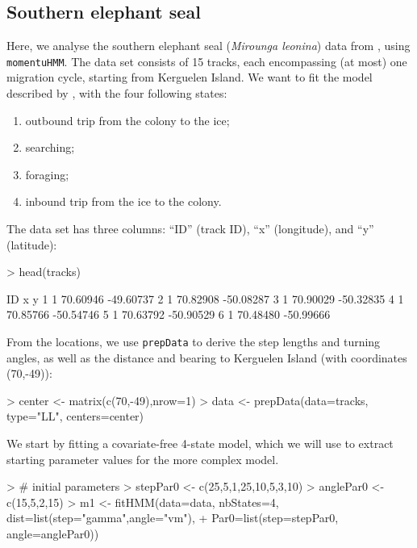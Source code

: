 \documentclass[12pt]{article}
\begin{document}
\subsection{Southern elephant seal}
Here, we analyse the southern elephant seal (\emph{Mirounga leonina}) data from \cite{MichelotEtAl2017}, using \verb|momentuHMM|. The data set consists of 15 tracks, each encompassing (at most) one migration cycle, starting from Kerguelen Island. We want to fit the model described by \cite{MichelotEtAl2017}, with the four following states:
\begin{enumerate}
\item outbound trip from the colony to the ice;
\item searching;
\item foraging;
\item inbound trip from the ice to the colony.
\end{enumerate}



The data set has three columns: ``ID'' (track ID), ``x'' (longitude), and ``y'' (latitude):

\begin{Schunk}
\begin{Sinput}
> head(tracks)
\end{Sinput}
\begin{Soutput}
  ID        x         y
1  1 70.60946 -49.60737
2  1 70.82908 -50.08287
3  1 70.90029 -50.32835
4  1 70.85766 -50.54746
5  1 70.63792 -50.90529
6  1 70.48480 -50.99666
\end{Soutput}
\end{Schunk}

From the locations, we use \verb|prepData| to derive the step lengths and turning angles, as well as the distance and bearing to Kerguelen Island (with coordinates (70,-49)):
\begin{Schunk}
\begin{Sinput}
> center <- matrix(c(70,-49),nrow=1)
> data <- prepData(data=tracks, type="LL", centers=center)
\end{Sinput}
\end{Schunk}

We start by fitting a covariate-free 4-state model, which we will use to extract starting parameter values for the more complex model.
\begin{Schunk}
\begin{Sinput}
> # initial parameters
> stepPar0 <- c(25,5,1,25,10,5,3,10)
> anglePar0 <- c(15,5,2,15)
> m1 <- fitHMM(data=data, nbStates=4, dist=list(step="gamma",angle="vm"), 
+              Par0=list(step=stepPar0, angle=anglePar0))
\end{Sinput}
\end{Schunk}
\end{document}
